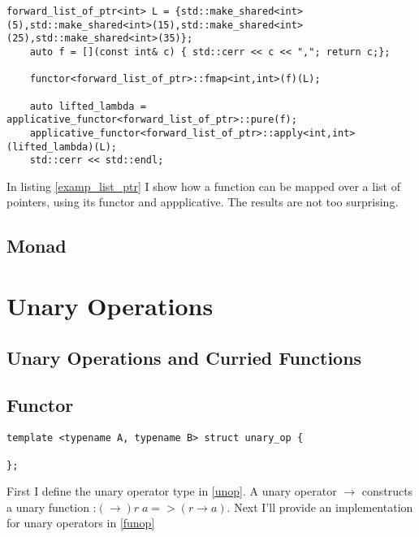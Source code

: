\documentclass[12pt,fleqn]{article}
\begin{document}
\begin{lstlisting}[caption=example for list of pointers, label=examp_list_ptr]
    forward_list_of_ptr<int> L = {std::make_shared<int>(5),std::make_shared<int>(15),std::make_shared<int>(25),std::make_shared<int>(35)};
    auto f = [](const int& c) { std::cerr << c << ","; return c;};

    functor<forward_list_of_ptr>::fmap<int,int>(f)(L);

    auto lifted_lambda = applicative_functor<forward_list_of_ptr>::pure(f);
    applicative_functor<forward_list_of_ptr>::apply<int,int>(lifted_lambda)(L);
	std::cerr << std::endl;
\end{lstlisting}

In listing \ref{examp_list_ptr} I show how a function can be mapped over a list of pointers, using its functor and appplicative.
The results are not too surprising.

%
%
\subsection{Monad}

%
%
\section{Unary Operations}
%
%

\subsection{Unary Operations and Curried Functions}

\subsection{Functor}

\begin{lstlisting}[caption=unary operator, label=unop]
template <typename A, typename B> struct unary_op {
  
};
\end{lstlisting}

First I define the unary operator type in \ref{unop}.
A unary operator $\rightarrow$ constructs a unary function :$(\rightarrow) r\;a => (r \rightarrow a)$.
Next I'll provide an implementation for unary operators in \ref{funop}
\end{document}
